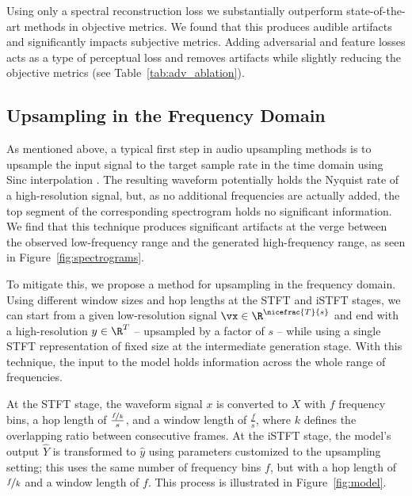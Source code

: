 Using only a spectral reconstruction loss we substantially outperform state-of-the-art methods in objective metrics. We found that this produces audible artifacts and significantly impacts subjective metrics. Adding adversarial and feature losses acts as a type of perceptual loss and removes artifacts while slightly reducing the objective metrics (see Table~\ref{tab:adv_ablation}).

\vspace{-0.2cm}
\subsection{Upsampling in the Frequency Domain}
\label{subsec:spec_upsampling}

As mentioned above, a typical first step in audio upsampling methods is to upsample the input signal to the target sample rate in the time domain using Sinc interpolation \cite{tfilm, nugan, nuwave2, seanet, bwe-all-you-need, mugan}. The resulting waveform potentially holds the Nyquist rate of a high-resolution signal, but, as no additional frequencies are actually added, the top segment of the corresponding spectrogram holds no significant information. We find that this technique produces significant artifacts at the verge between the observed low-frequency range and the generated high-frequency range, as seen in Figure~\ref{fig:spectrograms}.



To mitigate this, we propose a method for upsampling in the frequency domain. Using different window sizes and hop lengths at the \ac{STFT} and \ac{iSTFT} stages, we can start from a given low-resolution signal $\vx \in \R^{\nicefrac{T}{s}}$ and end with a high-resolution $y \in \R^{T}$ -- upsampled by a factor of $s$ -- while using a single \ac{STFT} representation of fixed size at the intermediate generation stage. With this technique, the input to the model holds information across the whole range of frequencies.

At the \ac{STFT} stage, the waveform signal $x$ is converted to $X$ with $f$ frequency bins, a hop length of $\frac{\nicefrac{f}{k}}{s}$, and a window length of $\frac{f}{s}$, where $k$ defines the overlapping ratio between consecutive frames.
At the \ac{iSTFT} stage, the model's output $\hat{Y}$ is transformed to $\hat{y}$ using parameters customized to the upsampling setting; this uses the same number of frequency bins $f$, but with a hop length of $\nicefrac{f}{k}$ and a window length of $f$. This process is illustrated in Figure~\ref{fig:model}.